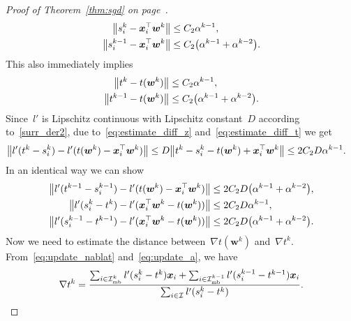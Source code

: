\begin{proof}[Proof of Theorem~\ref{thm:sgd} on page~\pageref{thm:sgd}]
  \begin{equation}\label{eq:estimate_diff_z}
    \begin{aligned}
      \norm{s_i^k - \bm{x}_i^\top \bm{w}^k} &\leq C_2\alpha^{k-1}, \\
      \norm{s_i^{k-1} - \bm{x}_i^\top \bm{w}^k} &\leq C_2\Brac{\alpha^{k-1}+\alpha^{k-2}}. \\
    \end{aligned}
  \end{equation}
  This also immediately implies
  \begin{equation}\label{eq:estimate_diff_t}
    \begin{aligned}
      \norm{t^k - t(\bm{w}^k)}     & \leq C_2\alpha^{k-1}, \\
      \norm{t^{k-1} - t(\bm{w}^k)} & \leq C_2\Brac{\alpha^{k-1}+\alpha^{k-2}}. \\
    \end{aligned}
  \end{equation}
  Since~$l'$ is Lipschitz continuous with Lipschitz constant~$D$ according to~\ref{surr_der2}, due to~\eqref{eq:estimate_diff_z} and~\eqref{eq:estimate_diff_t} we get
  \begin{equation}\label{eq:sgd_lipschitz1}
    \begin{aligned}
      \norm{l'(t^k-s_i^k) - l'(t(\bm{w}^k)-\bm{x}_i^\top \bm{w}^k)}
        & \leq D \norm{t^k-s_i^k - t(\bm{w}^k)+ \bm{x}_i^\top \bm{w}^k}
        \leq  2C_2 D \alpha^{k-1}.
    \end{aligned}
  \end{equation}
  In an identical way we can show
  \begin{equation}\label{eq:sgd_lipschitz2}
    \begin{aligned}
      \norm{l'(t^{k-1}-s_i^{k-1}) - l'(t(\bm{w}^k)-\bm{x}_i^\top \bm{w}^k)}
        & \leq 2C_2D\Brac{\alpha^{k-1}+\alpha^{k-2}}, \\
      \norm{l'(s_i^k-t^k) - l'(\bm{x}_i^\top \bm{w}^k-t(\bm{w}^k))}
        & \leq 2C_2D\alpha^{k-1}, \\
      \norm{l'(s_i^{k-1}-t^{k-1}) - l'(\bm{x}_i^\top \bm{w}^k-t(\bm{w}^k))}
        & \leq 2C_2D\Brac{\alpha^{k-1}+\alpha^{k-2}}.
    \end{aligned}
  \end{equation}
  Now we need to estimate the distance between~$\nabla t(\bm{w}^k)$ and~$\nabla t^k$. From~\eqref{eq:update_nablat} and~\eqref{eq:update_a}, we have
  \begin{equation*}
    \nabla t^k
      = \frac{\sum_{i \in \Imb^k} l'(s_i^k - t^k)\bm{x}_i + \sum_{i \in \Imb^{k-1}} l'(s_i^{k-1} - t^{k-1}) \bm{x}_i}{\sum_{i \in \I} l'(s_i^k - t^k)}.

\end{equation*}
\end{proof}
